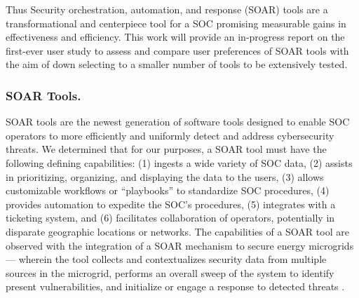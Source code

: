 Thus Security orchestration, automation, and response (SOAR) tools are a transformational and centerpiece tool for a SOC promising measurable gains in effectiveness and efficiency. This work will provide an in-progress report on the first-ever user study to assess and compare user preferences of SOAR tools with the aim of down selecting to a smaller number of tools to be extensively tested. %

\subsubsection{SOAR Tools.}
SOAR tools are the newest generation of software tools designed to enable SOC operators to more efficiently and uniformly detect and address cybersecurity threats. 
We determined that for our purposes, a SOAR tool must have the following defining capabilities: 
(1) ingests a wide variety of SOC data, 
(2) assists in prioritizing, organizing, and displaying the data to the users, 
(3) allows customizable workflows or ``playbooks'' to standardize SOC procedures, 
(4) provides automation to expedite the SOC's procedures, 
(5) integrates with a ticketing system, and 
(6) facilitates collaboration of operators, potentially in disparate geographic locations or networks. 
The capabilities of a SOAR tool are observed with the integration of a SOAR mechanism to secure energy microgrids--- wherein the tool collects and contextualizes security data from multiple sources in the microgrid, performs an overall sweep of the system to identify present vulnerabilities, and initialize or engage a response to detected threats \citep{microgrid}.

